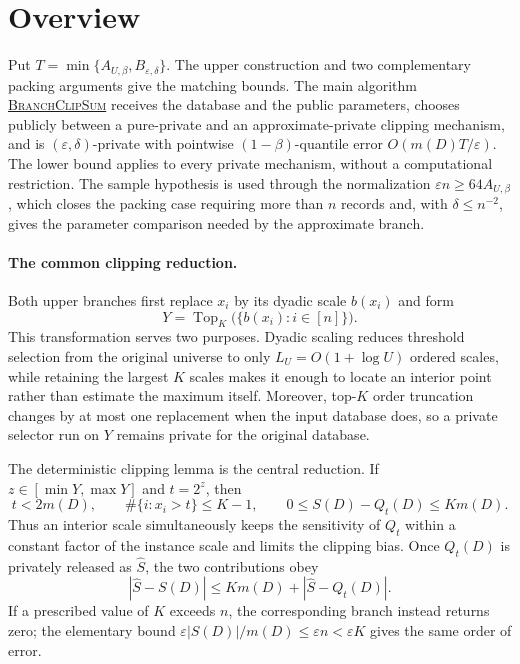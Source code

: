 \documentclass[11pt]{article}
\begin{document}
\section{Overview}
\label{sec:overview}

Put $T=\min\{A_{U,\beta},B_{\varepsilon,\delta}\}$.  The upper construction
and two complementary packing arguments give the matching bounds.  The main
algorithm
\hyperref[alg:branch-clip-sum]{\textsc{BranchClipSum}} receives the database
and the public parameters, chooses publicly between a pure-private and an
approximate-private clipping mechanism, and is $(\varepsilon,\delta)$-private
with pointwise $(1-\beta)$-quantile error $O(m(D)T/\varepsilon)$.  The lower
bound applies to every private mechanism, without a computational
restriction.  The sample hypothesis is used through the normalization
$\varepsilon n\ge64A_{U,\beta}$, which closes the packing case requiring more
than $n$ records and, with $\delta\le n^{-2}$, gives the parameter comparison
needed by the approximate branch.

\paragraph{The common clipping reduction.}
Both upper branches first replace $x_i$ by its dyadic scale $b(x_i)$ and
form
\[
 Y=\operatorname{Top}_K\bigl(\{b(x_i):i\in[n]\}\bigr).
\]
This transformation serves two purposes.  Dyadic scaling reduces threshold
selection from the original universe to only $L_U=O(1+\log U)$ ordered
scales, while retaining the largest $K$ scales makes it enough to locate an
interior point rather than estimate the maximum itself.  Moreover,
top-$K$ order truncation changes by at most one replacement when the input
database does, so a private selector run on $Y$ remains private for the
original database.

The deterministic clipping lemma is the central reduction.  If
$z\in[\min Y,\max Y]$ and $t=2^z$, then
\begin{equation}
 t<2m(D),\qquad
 \#\{i:x_i>t\}\le K-1,
 \qquad
 0\le S(D)-Q_t(D)\le K m(D).
 \label{eq:overview-clipping}
\end{equation}
Thus an interior scale simultaneously keeps the sensitivity of $Q_t$ within
a constant factor of the instance scale and limits the clipping bias.  Once
$Q_t(D)$ is privately released as $\widehat S$, the two contributions obey
\[
 |\widehat S-S(D)|
 \le K m(D)+|\widehat S-Q_t(D)|.
\]
If a prescribed value of $K$ exceeds $n$, the corresponding branch instead
returns zero; the elementary bound
$\varepsilon|S(D)|/m(D)\le\varepsilon n<\varepsilon K$ gives the same
order of error.
\end{document}
